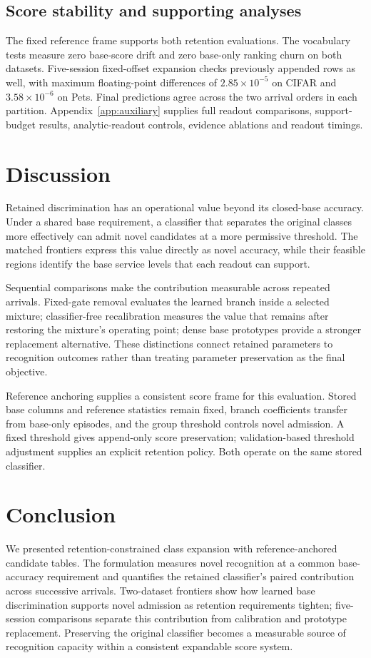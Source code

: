 \documentclass[research]{fcs}
\begin{document}
\subsection{Score stability and supporting analyses}
The fixed reference frame supports both retention evaluations. The vocabulary tests measure zero base-score drift and zero base-only ranking churn on both datasets. Five-session fixed-offset expansion checks previously appended rows as well, with maximum floating-point differences of $2.85\times10^{-5}$ on CIFAR and $3.58\times10^{-6}$ on Pets. Final predictions agree across the two arrival orders in each partition. Appendix~\ref{app:auxiliary} supplies full readout comparisons, support-budget results, analytic-readout controls, evidence ablations and readout timings.

\FloatBarrier
\section{Discussion}
Retained discrimination has an operational value beyond its closed-base accuracy. Under a shared base requirement, a classifier that separates the original classes more effectively can admit novel candidates at a more permissive threshold. The matched frontiers express this value directly as novel accuracy, while their feasible regions identify the base service levels that each readout can support.

Sequential comparisons make the contribution measurable across repeated arrivals. Fixed-gate removal evaluates the learned branch inside a selected mixture; classifier-free recalibration measures the value that remains after restoring the mixture's operating point; dense base prototypes provide a stronger replacement alternative. These distinctions connect retained parameters to recognition outcomes rather than treating parameter preservation as the final objective.

Reference anchoring supplies a consistent score frame for this evaluation. Stored base columns and reference statistics remain fixed, branch coefficients transfer from base-only episodes, and the group threshold controls novel admission. A fixed threshold gives append-only score preservation; validation-based threshold adjustment supplies an explicit retention policy. Both operate on the same stored classifier.

\section{Conclusion}
We presented retention-constrained class expansion with reference-anchored candidate tables. The formulation measures novel recognition at a common base-accuracy requirement and quantifies the retained classifier's paired contribution across successive arrivals. Two-dataset frontiers show how learned base discrimination supports novel admission as retention requirements tighten; five-session comparisons separate this contribution from calibration and prototype replacement. Preserving the original classifier becomes a measurable source of recognition capacity within a consistent expandable score system.
\end{document}
